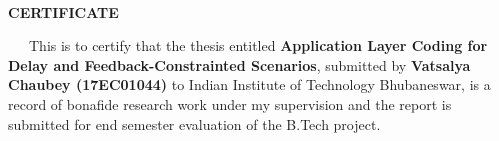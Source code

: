 

\thispagestyle{empty}
{~} %
\vspace{10em} %
\begin{center}
	\textbf{\Large CERTIFICATE}
\end{center}
~~~This is to certify that the thesis entitled  \textbf{Application Layer Coding for Delay and Feedback-Constrainted Scenarios}, submitted by \textbf{Vatsalya Chaubey (17EC01044)} to Indian Institute of Technology  Bhubaneswar, is a record of bonafide research work under my supervision and the report is submitted for end semester evaluation of the B.Tech project.

